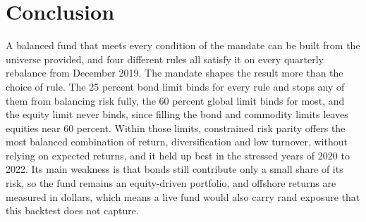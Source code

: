 \documentclass[11pt,preprint]{elsarticle}
\numberwithin{equation}{section}
\numberwithin{figure}{section}
\numberwithin{table}{section}
\begin{document}
\FloatBarrier

\section{\texorpdfstring{Conclusion
\label{Conclusion}}{Conclusion }}\label{conclusion}

A balanced fund that meets every condition of the mandate can be built
from the universe provided, and four different rules all satisfy it on
every quarterly rebalance from December 2019. The mandate shapes the
result more than the choice of rule. The 25 percent bond limit binds for
every rule and stops any of them from balancing risk fully, the 60
percent global limit binds for most, and the equity limit never binds,
since filling the bond and commodity limits leaves equities near 60
percent. Within those limits, constrained risk parity offers the most
balanced combination of return, diversification and low turnover,
without relying on expected returns, and it held up best in the stressed
years of 2020 to 2022. Its main weakness is that bonds still contribute
only a small share of its risk, so the fund remains an equity-driven
portfolio, and offshore returns are measured in dollars, which means a
live fund would also carry rand exposure that this backtest does not
capture.


\end{document}
